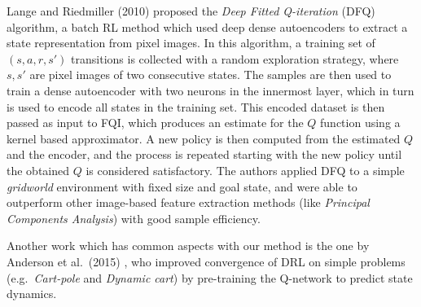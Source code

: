 Lange and Riedmiller (2010) \cite{lange2010deep} proposed the \textit{Deep 
Fitted Q-iteration} (DFQ) algorithm, a batch RL method which used deep dense 
autoencoders to extract a state representation from pixel images. 
In this algorithm, a training set of $(s, a, r, s')$ transitions is collected
with a random exploration strategy, where $s, s'$ are pixel images of two 
consecutive states. The samples are then used to train a dense autoencoder with 
two neurons in the innermost layer, which in turn is used to encode all states 
in the training set. This encoded dataset is then passed as input to FQI, 
which produces an estimate for the $Q$ function using a kernel based 
approximator. A new policy is then computed from the estimated $Q$ and the 
encoder, and the process is repeated starting with the new policy until the 
obtained $Q$ is considered satisfactory.
The authors applied DFQ to a simple \textit{gridworld} environment with fixed 
size and goal state, and were able to outperform other image-based feature
extraction methods (like \textit{Principal Components Analysis}) with good
sample efficiency.

Another work which has common aspects with our method is the one by Anderson et
al.\ (2015) \cite{anderson2015faster}, who improved convergence of DRL on 
simple problems (e.g.\ \textit{Cart-pole} and \textit{Dynamic cart}) by 
pre-training the Q-network to predict state dynamics.



























